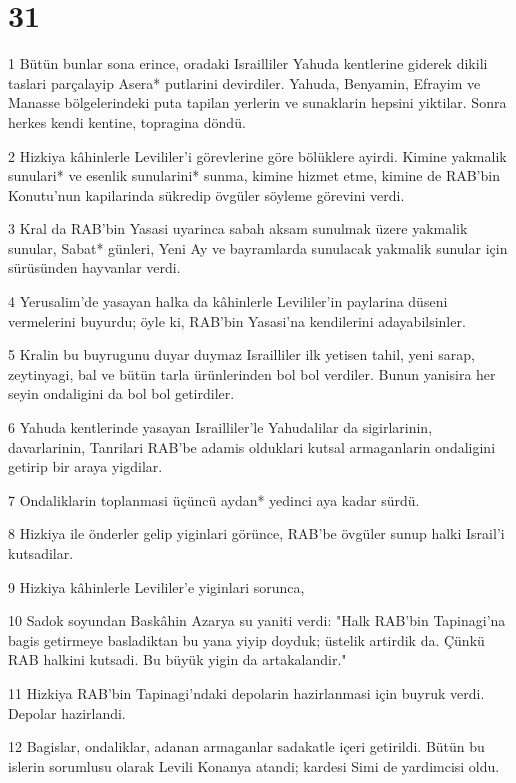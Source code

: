 \chapter{31}

\par 1 Bütün bunlar sona erince, oradaki Israilliler Yahuda kentlerine giderek dikili taslari parçalayip Asera* putlarini devirdiler. Yahuda, Benyamin, Efrayim ve Manasse bölgelerindeki puta tapilan yerlerin ve sunaklarin hepsini yiktilar. Sonra herkes kendi kentine, topragina döndü.
\par 2 Hizkiya kâhinlerle Levililer'i görevlerine göre bölüklere ayirdi. Kimine yakmalik sunulari* ve esenlik sunularini* sunma, kimine hizmet etme, kimine de RAB'bin Konutu'nun kapilarinda sükredip övgüler söyleme görevini verdi.
\par 3 Kral da RAB'bin Yasasi uyarinca sabah aksam sunulmak üzere yakmalik sunular, Sabat* günleri, Yeni Ay ve bayramlarda sunulacak yakmalik sunular için sürüsünden hayvanlar verdi.
\par 4 Yerusalim'de yasayan halka da kâhinlerle Levililer'in paylarina düseni vermelerini buyurdu; öyle ki, RAB'bin Yasasi'na kendilerini adayabilsinler.
\par 5 Kralin bu buyrugunu duyar duymaz Israilliler ilk yetisen tahil, yeni sarap, zeytinyagi, bal ve bütün tarla ürünlerinden bol bol verdiler. Bunun yanisira her seyin ondaligini da bol bol getirdiler.
\par 6 Yahuda kentlerinde yasayan Israilliler'le Yahudalilar da sigirlarinin, davarlarinin, Tanrilari RAB'be adamis olduklari kutsal armaganlarin ondaligini getirip bir araya yigdilar.
\par 7 Ondaliklarin toplanmasi üçüncü aydan* yedinci aya kadar sürdü.
\par 8 Hizkiya ile önderler gelip yiginlari görünce, RAB'be övgüler sunup halki Israil'i kutsadilar.
\par 9 Hizkiya kâhinlerle Levililer'e yiginlari sorunca,
\par 10 Sadok soyundan Baskâhin Azarya su yaniti verdi: "Halk RAB'bin Tapinagi'na bagis getirmeye basladiktan bu yana yiyip doyduk; üstelik artirdik da. Çünkü RAB halkini kutsadi. Bu büyük yigin da artakalandir."
\par 11 Hizkiya RAB'bin Tapinagi'ndaki depolarin hazirlanmasi için buyruk verdi. Depolar hazirlandi.
\par 12 Bagislar, ondaliklar, adanan armaganlar sadakatle içeri getirildi. Bütün bu islerin sorumlusu olarak Levili Konanya atandi; kardesi Simi de yardimcisi oldu.
